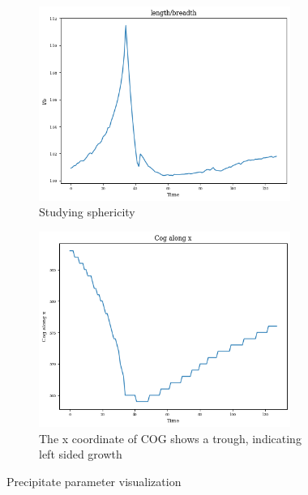 \documentclass[12pt, a4paper]{report}
\begin{document}
\begin{figure}[H]
\begin{subfigure}{.45\textwidth}
\end{subfigure}
\begin{subfigure}{.45\textwidth}
  \centering
  \includegraphics[width=0.9\textwidth]{Pictures/Results/1lb.jpeg}
  \caption{Studying sphericity}
  \label{img:microstrImg}
\end{subfigure}
\begin{subfigure}{.45\textwidth}
  \centering
  \includegraphics[width=0.9\textwidth]{Pictures/Results/1cogx.jpeg}
  \caption{The x coordinate of COG shows a trough, indicating left sided growth}
  \label{img:microstrImg}
\end{subfigure}
\caption{Precipitate parameter visualization}
\label{fig:test}
\end{figure}
\end{document}
